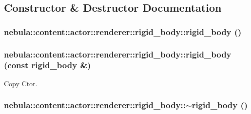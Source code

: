 \subsection{Constructor \& Destructor Documentation}
\hypertarget{classnebula_1_1content_1_1actor_1_1renderer_1_1rigid__body_a4426ca8f44892062a0ade68cea759888}{
\subsubsection[{rigid\_\-body}]{\setlength{\rightskip}{0pt plus 5cm}nebula::content::actor::renderer::rigid\_\-body::rigid\_\-body ()}}
\label{classnebula_1_1content_1_1actor_1_1renderer_1_1rigid__body_a4426ca8f44892062a0ade68cea759888}
\hypertarget{classnebula_1_1content_1_1actor_1_1renderer_1_1rigid__body_a708c13e330df06ee169b9c7a7755f406}{
\subsubsection[{rigid\_\-body}]{\setlength{\rightskip}{0pt plus 5cm}nebula::content::actor::renderer::rigid\_\-body::rigid\_\-body (const {\bf rigid\_\-body} \&)}}
\label{classnebula_1_1content_1_1actor_1_1renderer_1_1rigid__body_a708c13e330df06ee169b9c7a7755f406}


Copy Ctor. \hypertarget{classnebula_1_1content_1_1actor_1_1renderer_1_1rigid__body_aae25a1cd57c2de29eda7b723f145f3ab}{
\subsubsection[{$\sim$rigid\_\-body}]{\setlength{\rightskip}{0pt plus 5cm}nebula::content::actor::renderer::rigid\_\-body::$\sim$rigid\_\-body ()}}
\label{classnebula_1_1content_1_1actor_1_1renderer_1_1rigid__body_aae25a1cd57c2de29eda7b723f145f3ab}


